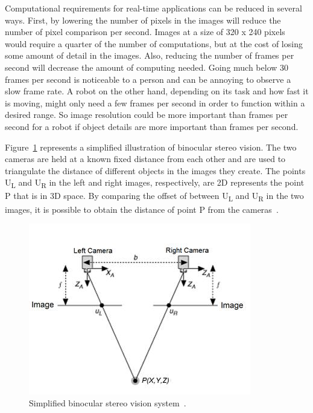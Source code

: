 Computational requirements for real-time applications can be reduced in several ways. First, by lowering the number of pixels in the images will reduce the number of pixel comparison per second. Images at a size of 320 x 240 pixels would require a quarter of the number of computations, but at the cost of losing some amount of detail in the images. Also, reducing the number of frames per second will decrease the amount of computing needed. Going much below 30 frames per second is noticeable to a person and can be annoying to observe a slow frame rate. A robot on the other hand, depending on its task and how fast it is moving, might only need a few frames per second in order to function within a desired range. So image resolution could be more important than frames per second for a robot if object details are more important than frames per second.

Figure~\ref{fig:sv_diagram} represents a simplified illustration of binocular stereo vision. The two cameras are held at a known fixed distance from each other and are used to triangulate the distance of different objects in the images they create. The points U\textsubscript{L} and U\textsubscript{R} in the left and right images, respectively, are 2D represents the point P that is in 3D space. By comparing the offset of between U\textsubscript{L} and U\textsubscript{R} in the two images, it is possible to obtain the distance of point P from the cameras~\cite{stereoVisionDiagram}.

\begin{figure}
	\begin{center}
		\includegraphics{figures/stereoVisionDiagram.jpg}
		\captionfonts
		\caption{Simplified binocular stereo vision system~\cite{stereoVisionDiagram}.}
		\label{fig:sv_diagram}
	\end{center}
\end{figure}

